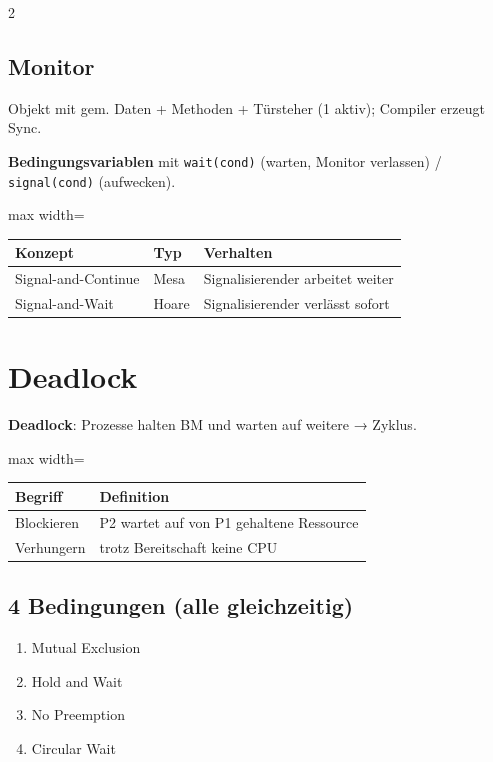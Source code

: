 \documentclass[10pt, a4paper]{article}
\begin{document}
\begin{multicols}{2}
\subsection{Monitor}

Objekt mit gem. Daten + Methoden + Türsteher (1 aktiv); Compiler erzeugt Sync.


\textbf{Bedingungsvariablen} mit \texttt{wait(cond)} (warten, Monitor verlassen) / \texttt{signal(cond)} (aufwecken).



{\small
\begin{adjustbox}{max width=\linewidth}
{\scriptsize
\begin{tabular}{lll}
\toprule
\textbf{Konzept} & \textbf{Typ} & \textbf{Verhalten} \\
\midrule
Signal-and-Continue & Mesa & Signalisierender arbeitet weiter \\
Signal-and-Wait & Hoare & Signalisierender verlässt sofort \\
\bottomrule
\end{tabular}
}
\end{adjustbox}
}



\section{Deadlock}

\textbf{Deadlock}: Prozesse halten BM und warten auf weitere → Zyklus.



{\small
\begin{adjustbox}{max width=\linewidth}
{\scriptsize
\begin{tabular}{ll}
\toprule
\textbf{Begriff} & \textbf{Definition} \\
\midrule
Blockieren & P2 wartet auf von P1 gehaltene Ressource \\
Verhungern & trotz Bereitschaft keine CPU \\
\bottomrule
\end{tabular}
}
\end{adjustbox}
}



\subsection{4 Bedingungen (alle gleichzeitig)}
\begin{enumerate}
  \item Mutual Exclusion
  \item Hold and Wait
  \item No Preemption
  \item Circular Wait
\end{enumerate}



\end{multicols}
\end{document}
